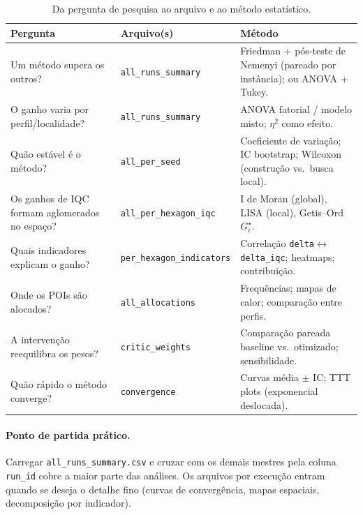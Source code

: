 \documentclass[11pt,a4paper]{article}
\begin{document}
\begin{table}[ht]
\centering
\caption{Da pergunta de pesquisa ao arquivo e ao método estatístico.}
\label{tab:receituario}
\small
\begin{tabular}{@{}p{4.6cm} p{4.2cm} p{5.6cm}@{}}
\toprule
\textbf{Pergunta} & \textbf{Arquivo(s)} & \textbf{Método} \\
\midrule
Um método supera os outros? &
\texttt{all\_runs\_summary} &
Friedman + pós-teste de Nemenyi (pareado por instância); ou ANOVA + Tukey. \\
\addlinespace
O ganho varia por perfil/localidade? &
\texttt{all\_runs\_summary} &
ANOVA fatorial / modelo misto; $\eta^2$ como efeito. \\
\addlinespace
Quão estável é o método? &
\texttt{all\_per\_seed} &
Coeficiente de variação; IC bootstrap; Wilcoxon (construção vs.\ busca local). \\
\addlinespace
Os ganhos de IQC formam aglomerados no espaço? &
\texttt{all\_per\_hexagon\_iqc} &
I de Moran (global), LISA (local), Getis--Ord $G_i^\star$. \\
\addlinespace
Quais indicadores explicam o ganho? &
\texttt{per\_hexagon\_indicators} &
Correlação \texttt{delta}$\leftrightarrow$\texttt{delta\_iqc}; heatmaps; contribuição. \\
\addlinespace
Onde os POIs são alocados? &
\texttt{all\_allocations} &
Frequências; mapas de calor; comparação entre perfis. \\
\addlinespace
A intervenção reequilibra os pesos? &
\texttt{critic\_weights} &
Comparação pareada baseline vs.\ otimizado; sensibilidade. \\
\addlinespace
Quão rápido o método converge? &
\texttt{convergence} &
Curvas média $\pm$ IC; TTT plots (exponencial deslocada). \\
\bottomrule
\end{tabular}
\end{table}

\paragraph{Ponto de partida prático.} Carregar \texttt{all\_runs\_summary.csv} e
cruzar com os demais mestres pela coluna \texttt{run\_id} cobre a maior parte das
análises. Os arquivos por execução entram quando se deseja o detalhe fino (curvas
de convergência, mapas espaciais, decomposição por indicador).

\end{document}
